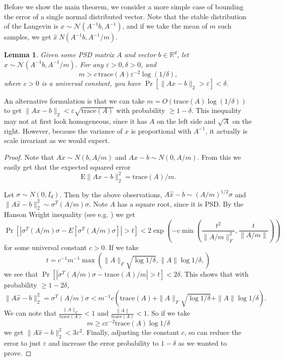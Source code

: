 \documentclass[11pt]{article}
\newtheorem{lemma}{Lemma}
\newcommand{\eps}{\varepsilon}
\newcommand{\R}{\mathbb{R}}
\newcommand{\N}{\mathcal{N}}
\newcommand{\E}{\mathrm{E}}
\newcommand{\tr}{\mathrm{trace}}
\begin{document}
Before we show the main theorem, we consider a more simple case of bounding the error of a single normal distributed vector.
%
Note that the stable distribution of the 
Langevin is $x \sim \N(A^{-1}b, A^{-1})$,
and if we take the mean of $m$ such samples, we get 
$\hat{x} ~ N(A^{-1}b, A^{-1}/m)$.

\begin{lemma}\label{lemma:independent}
Given some PSD matrix $A$ and vector $b\in\R^d$,
let $x \sim \N(A^{-1}b, A^{-1}/m)$.
For any $\eps>0, \delta>0$, and
\[
m > c\, \tr(A) \eps^{-2} \log(1/\delta),
\]
where $c > 0$ is a universal constant,
you have
$
\Pr[\|A x - b\|_2 > \eps] < \delta.
$
\end{lemma}

An alternative formulation is that we can take $m=O(\tr(A)\log(1/\delta))$ to get
$\|Ax-b\|_2
< \eps \sqrt{\tr(A)}$ with probability $\ge 1-\delta$.
This inequality may not at first look homogeneous, since it has $A$ on the left side and $\sqrt{A}$ on the right.
However, because the variance of $x$ is proportional with $A^{-1}$, it actually is scale invariant as we would expect.

\begin{proof}
Note that 
$A x \sim N(b, A/m)$
    and $A x - b \sim N(0, A/m)$.
From this we easily get that the expected squared error
\[
\E\|A x -b\|_2^2 = \tr(A)/m.
\]

Let $\sigma\sim N(0, I_d)$.
Then by the above observations,
$A \hat{x} - b \sim (A/m)^{1/2} \sigma$
and 
$\|A \hat{x} - b\|_2^2 \sim \sigma^T (A/m) \sigma$.
Note $A$ has a square root, since it is PSD.
%
By the Hanson Wright inequality (see e.g. \cite{rudelson2013hanson}) we get
\[
\Pr\left[\left|\sigma^T (A/m) \sigma - E[\sigma^T (A/m) \sigma]\right| > t\right]
 < 2 \exp\left(-c \min\left(
 \frac{t^2}{\|A/m\|_F^2},
 \frac{t}{\|A/m\|}
 \right)
 \right)
\]
for some universal constant $c > 0$.
If we take
\[
t = c^{-1} m^{-1}\max\left(
\|A\|_F \sqrt{\log1/\delta},
\|A\| \log1/\delta,
\right)
\]
we see that
$
\Pr\left[\left|\sigma^T (A/m) \sigma - \text{trace}(A)/m\right| > t\right]
< 2\delta.
$
This shows that with probability $\ge 1-2\delta$,
\[
\|A\hat{x}-b\|_2^2
= \sigma^T (A/m) \sigma
< m^{-1} c \left(
\text{trace}(A)
+  \|A\|_F \sqrt{\log1/\delta}
+ \|A\| \log1/\delta\right)
.
\]
We can note that 
$\frac{\|A\|_F}{\text{trace}(A)}<1$
and $\frac{\|A\|}{\text{trace}(A)}<1$.
So if we take
\[
m \ge c \varepsilon^{-2}
\tr(A)
\log1/\delta
\]
we get
$\|A\hat{x}-b\|_2^2 < 3\eps^2$.
Finally, adjusting the constant $c$, so can reduce the error to just $\eps$ and increase the error probability to $1-\delta$ as we wanted to prove.
\end{proof}
\end{document}
